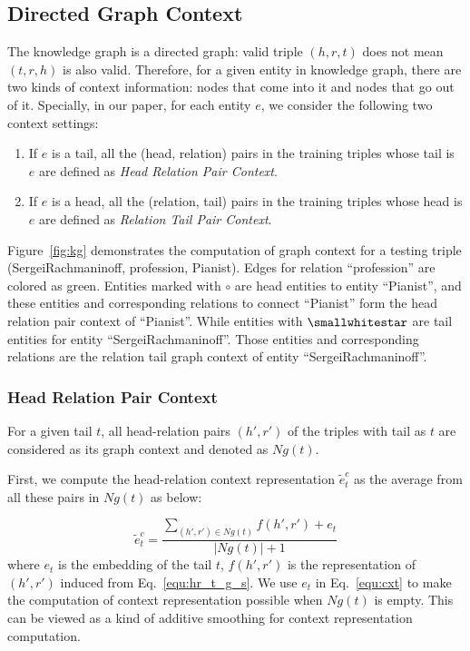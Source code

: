 \documentclass[11pt,a4paper]{article}
\begin{document}
\subsection{Directed Graph Context}

The knowledge graph is a directed graph: valid triple $(h, r, t)$ does not mean $(t, r, h)$ is also valid. Therefore, for a given entity in knowledge graph, there are two kinds of context information: nodes that come into it and nodes that go out of it.
Specially, in our paper, for each entity $e$, we consider the following two context settings:
\begin{enumerate} [leftmargin=10pt]
\setlength{\itemsep}{0pt}
\setlength{\parskip}{0pt}
    \item If $e$ is a tail, all the (head, relation) pairs in the training triples whose tail is $e$ are defined as \textit{Head Relation Pair Context}.
    \item If $e$ is a head, all the (relation, tail) pairs in the training triples whose head is $e$ are defined as \textit{Relation Tail Pair Context}.
\end{enumerate}
Figure~\ref{fig:kg} demonstrates the computation of graph context for a testing triple (SergeiRachmaninoff, profession, Pianist). Edges for relation ``profession'' are colored as green. Entities marked with $\circ$ are head entities to entity ``Pianist'', and these entities and corresponding relations to connect ``Pianist'' form the head relation pair context of ``Pianist''.   While entities with $\smallwhitestar$ are tail entities for entity ``SergeiRachmaninoff''. Those entities and corresponding relations are the relation tail graph context of entity ``SergeiRachmaninoff''. 

\subsubsection{Head Relation Pair Context}
For a given tail $t$, all head-relation pairs $(h',r')$ of the triples with tail as $t$ are considered as its graph context and denoted as $Ng(t)$.







First, we compute the head-relation context representation $\tilde{e}_t^c$ as the average from all these pairs in $Ng(t)$ as below:

\begin{equation}
    \tilde{e}_t^c  = \frac{\sum_{(h',r')\in Ng(t)} f(h',r') + e_t}{|Ng(t)| + 1}\label{equ:cxt}
\end{equation}
where $e_t$ is the embedding of the tail $t$, $f(h', r')$ is the representation of $(h', r')$ induced from Eq.~\ref{equ:hr_t_g_s}. We use $e_t$ in Eq.~\ref{equ:cxt} to make the computation of context representation possible when $Ng(t)$ is empty. 
This can be viewed as a kind of additive smoothing for context representation computation.
\end{document}
